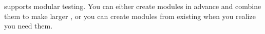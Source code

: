 
\app{} supports modular testing. You can either create modules in advance and combine them to make larger \gdcases{}, or you can create modules from existing \gdcases{} when you realize you need them. 

